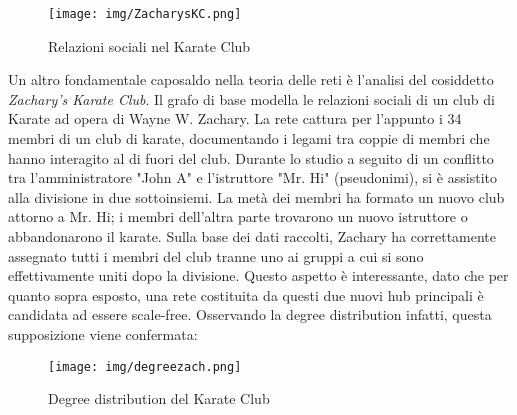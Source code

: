 \documentclass[12pt,twoside]{report}
\begin{document}
    \begin{figure}[h]
	    \centering
	    \texttt{[image: img/ZacharysKC.png]}
	    \caption{Relazioni sociali nel Karate Club}
	    \label{fig:my_label}
	\end{figure}
	\FloatBarrier
    
    Un altro fondamentale caposaldo nella teoria delle reti è l'analisi del cosiddetto \textit{Zachary's Karate Club}\cite{zachary1977information}. Il grafo di base modella le relazioni sociali di un club di Karate ad opera di Wayne W. Zachary. La rete cattura per l'appunto i 34 membri di un club di karate, documentando i legami tra coppie di membri che hanno interagito al di fuori del club. Durante lo studio a seguito di un conflitto tra l'amministratore "John A" e l'istruttore "Mr. Hi" (pseudonimi), si è assistito alla divisione in due sottoinsiemi. La metà dei membri ha formato un nuovo club attorno a Mr. Hi; i membri dell'altra parte trovarono un nuovo istruttore o abbandonarono il karate. Sulla base dei dati raccolti, Zachary ha correttamente assegnato tutti i membri del club tranne uno ai gruppi a cui si sono effettivamente uniti dopo la divisione. Questo aspetto è interessante, dato che per quanto sopra esposto, una rete costituita da questi due nuovi hub principali è candidata ad essere scale-free. Osservando la degree distribution infatti, questa supposizione viene confermata:
    
    \begin{figure}[h]
	    \centering
	    \texttt{[image: img/degreezach.png]}
	    \caption{Degree distribution del Karate Club}
	    \label{fig:my_label}
	\end{figure}
	\FloatBarrier
	
\end{document}
